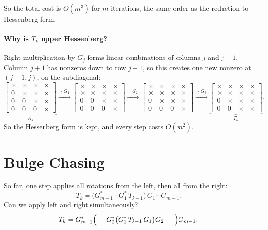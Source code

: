 So the total cost is $O(m^3)$ for $m$ iterations, the same order as the reduction to Hessenberg form.

\paragraph{Why is $T_k$ upper Hessenberg?} Right multiplication by $G_j$ forms linear combinations of columns $j$ and $j + 1$. Column $j + 1$ has nonzeros down to row $j + 1$, so this creates one new nonzero at $(j+1, j)$, on the subdiagonal:
\begin{equation}
  \underbrace{\begin{bmatrix} \times & \times & \times & \times \\ 0 & \times & \times & \times \\ 0 & 0 & \times & \times \\ 0 & 0 & 0 & \times \end{bmatrix}}_{R_k}
  \xrightarrow{\ \cdot\, G_1\ }
  \begin{bmatrix} \times & \times & \times & \times \\ \bm{\times} & \times & \times & \times \\ 0 & 0 & \times & \times \\ 0 & 0 & 0 & \times \end{bmatrix}
  \xrightarrow{\ \cdot\, G_2\ }
  \begin{bmatrix} \times & \times & \times & \times \\ \times & \times & \times & \times \\ 0 & \bm{\times} & \times & \times \\ 0 & 0 & 0 & \times \end{bmatrix}
  \xrightarrow{\ \cdot\, G_3\ }
  \underbrace{\begin{bmatrix} \times & \times & \times & \times \\ \times & \times & \times & \times \\ 0 & \times & \times & \times \\ 0 & 0 & \bm{\times} & \times \end{bmatrix}}_{T_k}.
\end{equation}
So the Hessenberg form is kept, and every step costs $O(m^2)$.

\section{Bulge Chasing}
\label{sec:bulge-chasing}

So far, one step applies all rotations from the left, then all from the right:
\begin{equation}
  T_k = \bigl(G_{m-1}^\ast\cdots G_1^\ast\,T_{k-1}\bigr)\,G_1\cdots G_{m-1}.
\end{equation}
Can we apply left and right simultaneously?
\begin{equation}
  T_k = G_{m-1}^\ast\Bigl(\cdots G_2^\ast\bigl(G_1^\ast\,T_{k-1}\,G_1\bigr)G_2\cdots\Bigr)G_{m-1}.
\end{equation}

